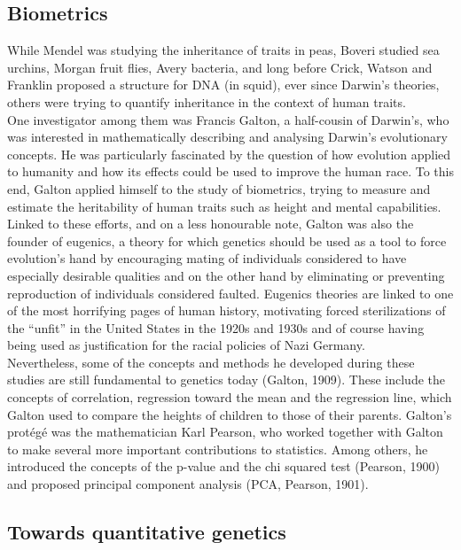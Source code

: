 \subsection{Biometrics} %
While Mendel was studying the inheritance of traits in peas, Boveri studied sea urchins, Morgan fruit flies, Avery bacteria, and long before Crick, Watson and Franklin proposed a structure for DNA (in squid), ever since Darwin’s theories, others were trying to quantify inheritance in the context of human traits.\\ 

One investigator among them was Francis Galton, a half-cousin of Darwin’s, who was interested in mathematically describing and analysing Darwin’s evolutionary concepts. 
He was particularly fascinated by the question of how evolution applied to humanity and how its effects could be used to improve the human race. 
To this end, Galton applied himself to the study of biometrics, trying to measure and estimate the heritability of human traits such as height and mental capabilities.\\ 

Linked to these efforts, and on a less honourable note, Galton was also the founder of eugenics, a theory for which genetics should be used as a tool to force evolution’s hand by encouraging mating of individuals considered to have especially desirable qualities and on the other hand by eliminating or preventing reproduction of individuals considered faulted. Eugenics theories are linked to one of the most horrifying pages of human history, motivating forced sterilizations of the “unfit” in the United States in the 1920s and 1930s and of course having being used as justification for the racial policies of Nazi Germany.\\ 

Nevertheless, some of the concepts and methods he developed during these studies are still fundamental to genetics today (Galton, 1909). 
These include the concepts of correlation, regression toward the mean and the regression line, which Galton used to compare the heights of children to those of their parents. Galton’s protégé was the mathematician Karl Pearson, who worked together with Galton to make several more important contributions to statistics. Among others, he introduced the concepts of the p-value and the chi squared test (Pearson, 1900) and proposed principal component analysis (PCA, Pearson, 1901).

\subsection{Towards quantitative genetics} %

